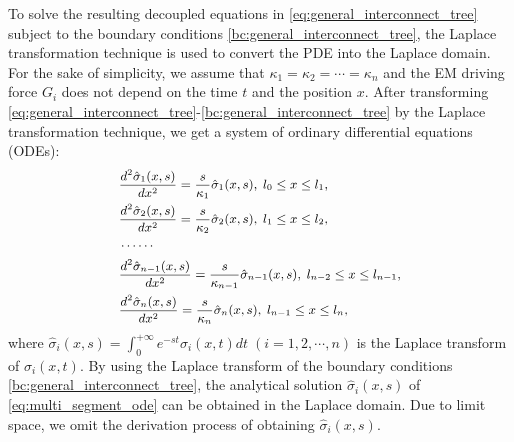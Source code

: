  To solve the resulting decoupled equations in
 \eqref{eq:general_interconnect_tree} subject to the boundary
 conditions \eqref{bc:general_interconnect_tree}, the Laplace
 transformation technique is used to convert the PDE into the Laplace
 domain. For the sake of simplicity, we assume that
 $\kappa_1=\kappa_2=\cdots=\kappa_n$ and the EM driving force $G_i$ does not
 depend on the time $t$ and the position $x$. After transforming
 \eqref{eq:general_interconnect_tree}-\eqref{bc:general_interconnect_tree}
 by the Laplace transformation technique, we get a system of ordinary
 differential equations (ODEs):
  \begin{equation} \label{eq:multi_segment_ode}\small
\begin{split}
&\frac{d^2\hat{\sigma}_1(x,s)}{dx^2}=\frac{s}{\kappa_1}\hat{\sigma}_1(x,s),\;l_0\leq x\leq l_1,\\
&\frac{d^2\hat{\sigma}_2(x,s)}{dx^2}=\frac{s}{\kappa_2}\hat{\sigma}_2(x,s),\;l_1\leq x\leq l_2,\\
&\cdots\cdots\\
&\frac{d^2\hat{\sigma}_{n-1}(x,s)}{dx^2}=\frac{s}{\kappa_{n-1}}\hat{\sigma}_{n-1}(x,s),\;l_{n-2}\leq x\leq l_{n-1},\\
&\frac{d^2\hat{\sigma}_{n}(x,s)}{dx^2}=\frac{s}{\kappa_{n}}\hat{\sigma}_{n}(x,s),\;l_{n-1}\leq x\leq l_{n},
 \end{split}
 \end{equation}
where $\hat{\sigma}_{i}(x,s)=\int_0^{+\infty}e^{-st}\sigma_{i}(x,t)dt\;(i=1,2,\cdots,n)$ is the Laplace transform of $\sigma_{i}(x,t)$.
By using the Laplace transform of the boundary conditions \eqref{bc:general_interconnect_tree},
the analytical solution $\hat{\sigma}_{i}(x,s)$ of \eqref{eq:multi_segment_ode} can be obtained in the Laplace domain. Due to limit space,
we omit the derivation process of obtaining $\hat{\sigma}_{i}(x,s)$.

